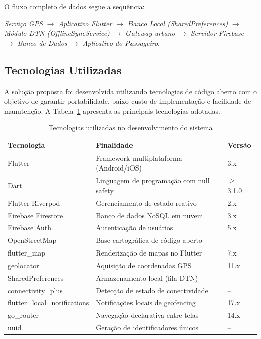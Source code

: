 \documentclass[12pt]{article}
\begin{document}
O fluxo completo de dados segue a sequência:

\textit{Serviço GPS} $\rightarrow$ \textit{Aplicativo Flutter} $\rightarrow$ \textit{Banco Local (SharedPreferences)} $\rightarrow$ \textit{Módulo DTN (OfflineSyncService)} $\rightarrow$ \textit{Gateway urbano} $\rightarrow$ \textit{Servidor Firebase} $\rightarrow$ \textit{Banco de Dados} $\rightarrow$ \textit{Aplicativo do Passageiro}.

\subsection{Tecnologias Utilizadas}
A solução proposta foi desenvolvida utilizando tecnologias de código aberto com o objetivo de garantir portabilidade, baixo custo de implementação e facilidade de manutenção. A Tabela~\ref{tab:tecnologias} apresenta as principais tecnologias adotadas.

\begin{table}[H]
\caption{Tecnologias utilizadas no desenvolvimento do sistema}
\label{tab:tecnologias}
\centering
\renewcommand{\arraystretch}{1.25}
\begin{tabularx}{\textwidth}{lXl}
\toprule
\textbf{Tecnologia} & \textbf{Finalidade} & \textbf{Versão} \\
\midrule
Flutter & Framework multiplataforma (Android/iOS) & 3.x \\
Dart & Linguagem de programação com null safety & $\geq$ 3.1.0 \\
Flutter Riverpod & Gerenciamento de estado reativo & 2.x \\
Firebase Firestore & Banco de dados NoSQL em nuvem & 3.x \\
Firebase Auth & Autenticação de usuários & 5.x \\
OpenStreetMap & Base cartográfica de código aberto & -- \\
flutter\_map & Renderização de mapas no Flutter & 7.x \\
geolocator & Aquisição de coordenadas GPS & 11.x \\
SharedPreferences & Armazenamento local (fila DTN) & -- \\
connectivity\_plus & Detecção de estado de conectividade & -- \\
flutter\_local\_notifications & Notificações locais de geofencing & 17.x \\
go\_router & Navegação declarativa entre telas & 14.x \\
uuid & Geração de identificadores únicos & -- \\
\bottomrule
\end{tabularx}
\end{table}
\end{document}
